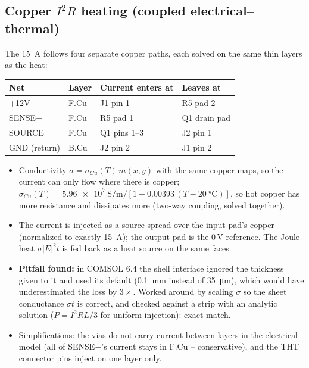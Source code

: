 \documentclass[11pt,letterpaper]{article}
\begin{document}
\subsection{Copper $I^2R$ heating (coupled electrical--thermal)}
\label{sec:joule}

The \SI{15}{\ampere} follows four separate copper paths, each solved on the same thin layers as the heat:

\begin{center}
\begin{tabular}{@{}llll@{}}
\toprule
Net & Layer & Current enters at & Leaves at \\
\midrule
+12V & F.Cu & J1 pin 1 & R5 pad 2 \\
SENSE$-$ & F.Cu & R5 pad 1 & Q1 drain pad \\
SOURCE & F.Cu & Q1 pins 1--3 & J2 pin 1 \\
GND (return) & B.Cu & J2 pin 2 & J1 pin 2 \\
\bottomrule
\end{tabular}
\end{center}

\begin{itemize}[nosep]
\item Conductivity $\sigma=\sigma_{Cu}(T)\,m(x,y)$ with the same copper maps, so the current can only flow
where there is copper; $\sigma_{Cu}(T)=\SI{5.96e7}{\siemens\per\meter}/[1+0.00393\,(T-\SI{20}{\celsius})]$,
so hot copper has more resistance and dissipates more (two-way coupling, solved together).
\item The current is injected as a source spread over the input pad's copper (normalized to exactly
\SI{15}{\ampere}); the output pad is the 0\,V reference. The Joule heat $\sigma|E|^2t$ is fed back as a
heat source on the same faces.
\item \textbf{Pitfall found:} in COMSOL 6.4 the shell interface ignored the thickness given to it and used
its default (\SI{0.1}{\milli\meter} instead of \SI{35}{\micro\meter}), which would have underestimated the
loss by $3\times$. Worked around by scaling $\sigma$ so the sheet conductance $\sigma t$ is correct, and
checked against a strip with an analytic solution ($P=I^2RL/3$ for uniform injection): exact match.
\item Simplifications: the vias do not carry current between layers in the electrical model (all of
SENSE$-$'s current stays in F.Cu -- conservative), and the THT connector pins inject on one layer only.
\end{itemize}
\end{document}
